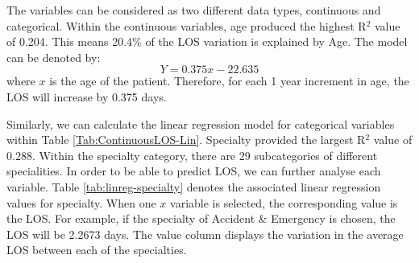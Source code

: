 \documentclass[../thesis.tex]{subfiles}
\begin{document}
The variables can be considered as two different data types, continuous and categorical. Within the continuous variables, age produced the highest R$^{2}$ value of 0.204. This means 20.4\% of the LOS variation is explained by Age. The model can be denoted by: 
\begin{equation}
    Y = 0.375x - 22.635
\end{equation}
where $x$ is the age of the patient.
Therefore, for each 1 year increment in age, the LOS will increase by 0.375 days.

Similarly, we can calculate the linear regression model for categorical variables within Table \ref{Tab:ContinuousLOS-Lin}. Specialty provided the largest R$^{2}$ value of 0.288. Within the specialty category, there are 29 subcategories of different specialities. In order to be able to predict LOS, we can further analyse each variable. Table \ref{tab:linreg-specialty} denotes the associated linear regression values for specialty. When one $x$ variable is selected, the corresponding value is the LOS. For example, if the specialty of Accident \& Emergency is chosen, the LOS will be 2.2673 days. The value column displays the variation in the average LOS between each of the specialties.

\end{document}
